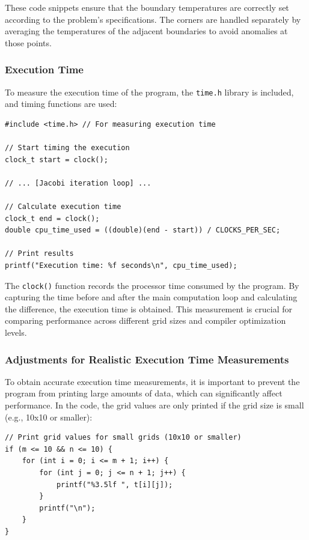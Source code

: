 \documentclass{article}
\begin{document}
These code snippets ensure that the boundary temperatures are correctly set according to the problem's specifications. The corners are handled separately by averaging the temperatures of the adjacent boundaries to avoid anomalies at those points.

\subsubsection{Execution Time}

To measure the execution time of the program, the \texttt{time.h} library is included, and timing functions are used:

\begin{lstlisting}[style=CStyle, caption={Execution Time Measurement}]
#include <time.h> // For measuring execution time

// Start timing the execution
clock_t start = clock();

// ... [Jacobi iteration loop] ...

// Calculate execution time
clock_t end = clock();
double cpu_time_used = ((double)(end - start)) / CLOCKS_PER_SEC;

// Print results
printf("Execution time: %f seconds\n", cpu_time_used);
\end{lstlisting}

The \texttt{clock()} function records the processor time consumed by the program. By capturing the time before and after the main computation loop and calculating the difference, the execution time is obtained. This measurement is crucial for comparing performance across different grid sizes and compiler optimization levels.

\subsubsection{Adjustments for Realistic Execution Time Measurements}

To obtain accurate execution time measurements, it is important to prevent the program from printing large amounts of data, which can significantly affect performance. In the code, the grid values are only printed if the grid size is small (e.g., 10x10 or smaller):

\begin{lstlisting}[style=CStyle, caption={Printing Grid Values for Small Grids}]
// Print grid values for small grids (10x10 or smaller)
if (m <= 10 && n <= 10) {
    for (int i = 0; i <= m + 1; i++) {
        for (int j = 0; j <= n + 1; j++) {
            printf("%3.5lf ", t[i][j]);
        }
        printf("\n");
    }
}
\end{lstlisting}
\end{document}
